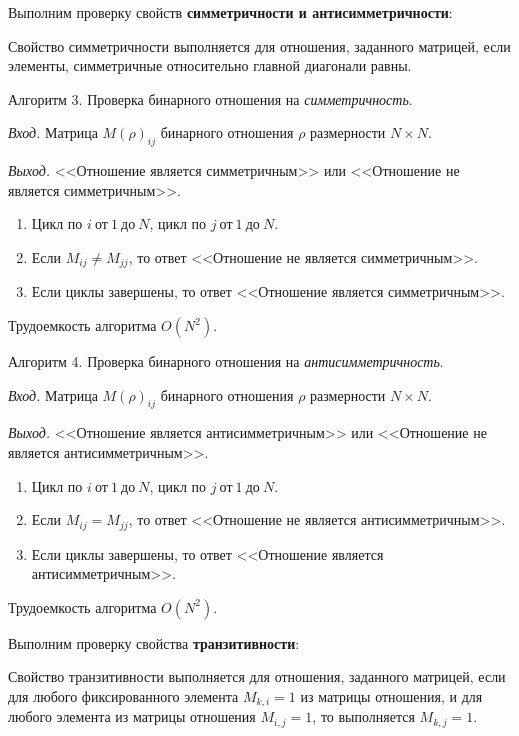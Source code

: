 \documentclass[bachelor, och, labwork]{shiza}
\begin{document}
Выполним проверку свойств \textbf{симметричности и антисимметричности}:

Свойство симметричности выполняется для отношения, заданного матрицей, если
элементы, симметричные относительно главной диагонали равны.

Алгоритм 3. Проверка бинарного отношения на \textit{симметричность}.

\textit{Вход.} Матрица $M(\rho)_{ij}$ бинарного отношения $\rho$ размерности
$N \times N$.

\textit{Выход.} <<Отношение является симметричным>> или <<Отношение не является
симметричным>>.

\begin{enumerate}
    \item Цикл по $i ~\text{от}~ 1 ~\text{до}~ N$, 
    цикл по $j ~\text{от}~ 1 ~\text{до}~ N$.

    \item Если $M_{ij} \not= M_{jj}$, то ответ <<Отношение не является симметричным>>.
    
    \item Если циклы завершены, то ответ <<Отношение является симметричным>>.

\end{enumerate}
Трудоемкость алгоритма $O(N^2)$.

Алгоритм 4. Проверка бинарного отношения на \textit{антисимметричность}.

\textit{Вход.} Матрица $M(\rho)_{ij}$ бинарного отношения $\rho$ размерности
$N \times N$.

\textit{Выход.} <<Отношение является антисимметричным>> или <<Отношение не является
антисимметричным>>.

\begin{enumerate}
    \item Цикл по $i ~\text{от}~ 1 ~\text{до}~ N$, 
    цикл по $j ~\text{от}~ 1 ~\text{до}~ N$.

    \item Если $M_{ij} = M_{jj}$, то ответ <<Отношение не является антисимметричным>>.
    
    \item Если циклы завершены, то ответ <<Отношение является антисимметричным>>.

\end{enumerate}
Трудоемкость алгоритма $O(N^2)$.

Выполним проверку свойства \textbf{транзитивности}:

Свойство транзитивности выполняется для отношения, заданного матрицей, если для 
любого фиксированного элемента $M_{k,i}=1$ из матрицы отношения, и для любого
элемента из матрицы отношения $M_{i,j}=1$, то выполняется $M_{k,j}=1$.
\end{document}

